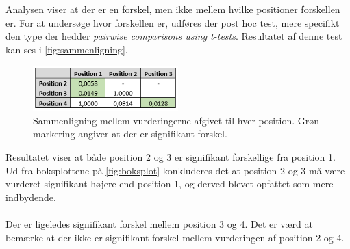 Analysen viser at der er en forskel, men ikke mellem hvilke positioner forskellen er. For at undersøge hvor forskellen er, udføres der post hoc test, mere specifikt den type der hedder \textit{pairwise comparisons using t-tests}. Resultatet af denne test kan ses i \autoref{fig:sammenligning}.
\begin{figure}[H]
\centering
\includegraphics[width = 0.5\textwidth]{Figure/PostHocExcel.PNG} 
\caption{Sammenligning mellem vurderingerne afgivet til hver position. Grøn markering angiver at der er signifikant forskel.}
\label{fig:sammenligning}
\end{figure}

\noindent Resultatet viser at både position 2 og 3 er signifikant forskellige fra position 1. Ud fra boksplottene på \autoref{fig:boksplot} konkluderes det at position 2 og 3 må være vurderet signifikant højere end position 1, og derved blevet opfattet som mere indbydende. 
\\\\
Der er ligeledes signifikant forskel mellem position 3 og 4. Det er værd at bemærke at der ikke er signifikant forskel mellem vurderingen af position 2 og 4. 